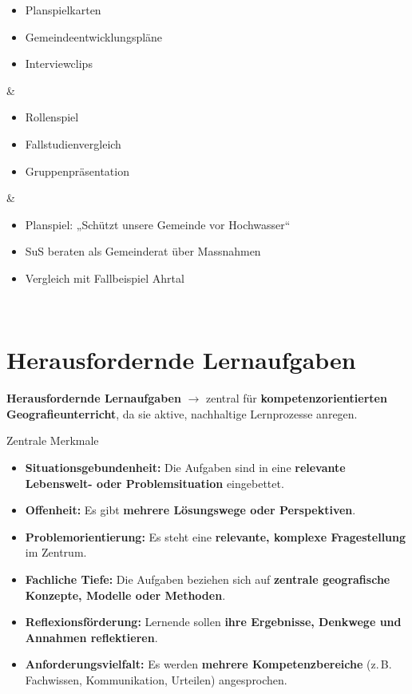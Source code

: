 \begin{table}[H]
\begin{tabular}
\begin{itemize}[leftmargin=*,nosep]
      \item Planspielkarten
      \item Gemeindeentwicklungspläne
      \item Interviewclips
    \end{itemize}                                             &
    \begin{itemize}[leftmargin=*,nosep]
      \item Rollenspiel
      \item Fallstudienvergleich
      \item Gruppenpräsentation
    \end{itemize}                                             &
    \begin{itemize}[leftmargin=*,nosep]
      \item Planspiel: „Schützt unsere Gemeinde vor Hochwasser“
      \item SuS beraten als Gemeinderat über Massnahmen
      \item Vergleich mit Fallbeispiel Ahrtal
    \end{itemize}                          \\
  \end{tabular}
  \caption{Adaptiver Unterricht mit AEL (Analytisch-erkenntnisorientierter Lernansatz)}
\end{table}

\section*{Herausfordernde Lernaufgaben}

\textbf{Herausfordernde Lernaufgaben} $\rightarrow$ zentral für \textbf{kompetenzorientierten Geografieunterricht}, da sie aktive, nachhaltige Lernprozesse anregen.

Zentrale Merkmale
\begin{itemize}
  \item \textbf{Situationsgebundenheit:} Die Aufgaben sind in eine \textbf{relevante Lebenswelt- oder Problemsituation} eingebettet.
  \item \textbf{Offenheit:} Es gibt \textbf{mehrere Lösungswege oder Perspektiven}.
  \item \textbf{Problemorientierung:} Es steht eine \textbf{relevante, komplexe Fragestellung} im Zentrum.
  \item \textbf{Fachliche Tiefe:} Die Aufgaben beziehen sich auf \textbf{zentrale geografische Konzepte, Modelle oder Methoden}.
  \item \textbf{Reflexionsförderung:} Lernende sollen \textbf{ihre Ergebnisse, Denkwege und Annahmen reflektieren}.
  \item \textbf{Anforderungsvielfalt:} Es werden \textbf{mehrere Kompetenzbereiche} (z.\,B. Fachwissen, Kommunikation, Urteilen) angesprochen.
\end{itemize}

